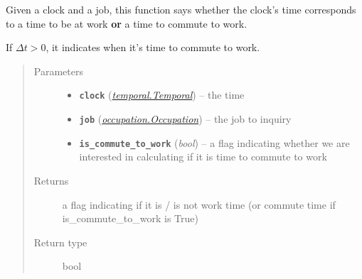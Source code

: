 \documentclass[letterpaper,10pt,english]{sphinxmanual}
\begin{document}

\begin{fulllineitems}
\label{occupation:occupation.is_work_time}
Given a clock and a job, this function says whether the clock's time corresponds     to a time to be at work \textbf{or} a time to commute to work.

If \(\Delta{t} > 0\), it indicates when it's time to commute to work.
\begin{quote}\begin{description}
\item[{Parameters}] \leavevmode\begin{itemize}
\item {} 
\textbf{\texttt{clock}} ({\hyperref[temporal:temporal.Temporal]{\emph{\emph{temporal.Temporal}}}}) -- the time

\item {} 
\textbf{\texttt{job}} ({\hyperref[occupation:occupation.Occupation]{\emph{\emph{occupation.Occupation}}}}) -- the job to inquiry

\item {} 
\textbf{\texttt{is\_commute\_to\_work}} (\emph{bool}) -- a flag indicating whether we are interested in calculating if it is                             time to commute to work

\end{itemize}

\item[{Returns}] \leavevmode
a flag indicating if it is / is not work time (or commute time if is\_commute\_to\_work is True)

\item[{Return type}] \leavevmode
bool

\end{description}\end{quote}

\end{fulllineitems}

\end{document}
